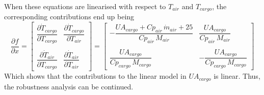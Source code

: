 When these equations are linearised with respect to $ T_{air} $ and $ T_{cargo} $, the corresponding contributions end up being
\begin{equation} \label{eq:UA_cargo_dependencies}
	\dfrac{\partial f}{\partial x} =
	\begin{bmatrix}
		\dfrac{\partial \dot{T}_{cargo}}{\partial T_{cargo}}  & \dfrac{\partial \dot{T}_{cargo}}{\partial T_{air}}\\
		\\
		\dfrac{\partial \dot{T}_{air}}{\partial T_{cargo}}  & \dfrac{\partial  \dot{T}_{air}}{\partial T_{air}}
	\end{bmatrix}
	=
	\begin{bmatrix}
		-\dfrac{UA_{cargo} +Cp_{air} \,\dot{m}_{air} +25}{Cp_{air} \,M_{air}}  & \dfrac{UA_{cargo} }{Cp_{air} \,M_{air} }\\
		\\
		\dfrac{UA_{cargo} }{Cp_{cargo} \,M_{cargo} }  & -\dfrac{UA_{cargo} }{Cp_{cargo} \,M_{cargo} }
	\end{bmatrix}
\end{equation}
Which shows that the contributions to the linear model in $ UA_{cargo} $ is linear.
Thus, the robustness analysis can be continued.

